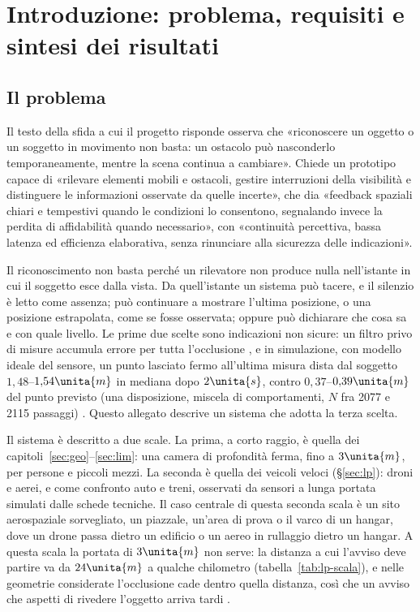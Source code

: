 \section{Introduzione: problema, requisiti e sintesi dei risultati}\label{sec:intro}

\subsection{Il problema}\label{sec:intro-problema}

Il testo della sfida a cui il progetto risponde osserva che «riconoscere un oggetto o un soggetto in movimento non basta: un ostacolo può nasconderlo temporaneamente, mentre la scena continua a cambiare». Chiede un prototipo capace di «rilevare elementi mobili e ostacoli, gestire interruzioni della visibilità e distinguere le informazioni osservate da quelle incerte», che dia «feedback spaziali chiari e tempestivi quando le condizioni lo consentono, segnalando invece la perdita di affidabilità quando necessario», con «continuità percettiva, bassa latenza ed efficienza elaborativa, senza rinunciare alla sicurezza delle indicazioni».

Il riconoscimento non basta perché un rilevatore non produce nulla nell'istante in cui il soggetto esce dalla vista. Da quell'istante un sistema può tacere, e il silenzio è letto come assenza; può continuare a mostrare l'ultima posizione, o una posizione estrapolata, come se fosse osservata; oppure può dichiarare che cosa sa e con quale livello. Le prime due scelte sono indicazioni non sicure: un filtro privo di misure accumula errore per tutta l'occlusione \cite{cao2023}, e in simulazione, con modello ideale del sensore, un punto lasciato fermo all'ultima misura dista dal soggetto $1{,}48$--$1{,}54\unita{m}$ in mediana dopo $2\unita{s}$, contro $0{,}37$--$0{,}39\unita{m}$ del punto previsto (una disposizione, miscela di comportamenti, $N$ fra 2077 e 2115 passaggi) . Questo allegato descrive un sistema che adotta la terza scelta.

Il sistema è descritto a due scale. La prima, a corto raggio, è quella dei capitoli~\ref{sec:geo}--\ref{sec:lim}: una camera di profondità ferma, fino a $3\unita{m}$, per persone e piccoli mezzi. La seconda è quella dei veicoli veloci (\S\ref{sec:lp}): droni e aerei, e come confronto auto e treni, osservati da sensori a lunga portata simulati dalle schede tecniche. Il caso centrale di questa seconda scala è un sito aerospaziale sorvegliato, un piazzale, un'area di prova o il varco di un hangar, dove un drone passa dietro un edificio o un aereo in rullaggio dietro un hangar. A questa scala la portata di $3\unita{m}$ non serve: la distanza a cui l'avviso deve partire va da $24\unita{m}$ a qualche chilometro (tabella~\ref{tab:lp-scala}), e nelle geometrie considerate l'occlusione cade dentro quella distanza, così che un avviso che aspetti di rivedere l'oggetto arriva tardi .

